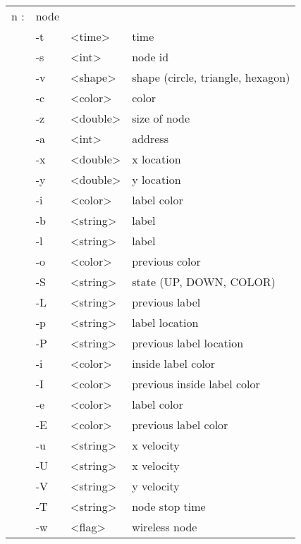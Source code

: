   \begin{tabular}{llll}
  n : & node & & \\
    &  -t & <time> & time \\
    &  -s & <int> & node id \\
    &  -v & <shape> & shape (circle, triangle, hexagon) \\
    &  -c & <color> & color \\
    &  -z & <double> & size of node \\
    &  -a & <int> & address \\
    &  -x & <double> & x location \\
    &  -y & <double> & y location \\
    &  -i & <color> & label color \\
    &  -b & <string> & label \\
    &  -l & <string> & label \\
    &  -o & <color> & previous color \\
    &  -S & <string> & state (UP, DOWN, COLOR) \\
    &  -L & <string> & previous label \\
    &  -p & <string> & label location \\
    &  -P & <string> & previous label location \\
    &  -i & <color> & inside label color \\
    &  -I & <color> & previous inside label color \\
    &  -e & <color> & label color \\
    &  -E & <color> & previous label color \\
    &  -u & <string> & x velocity \\
    &  -U & <string> & x velocity \\
    &  -V & <string> & y velocity \\
    &  -T & <string> & node stop time \\
    &  -w & <flag> & wireless node \\
  \end{tabular}

